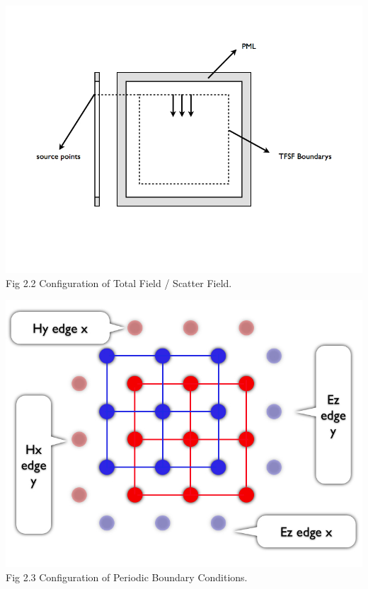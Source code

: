 \documentclass[openany]{book}
\begin{document}
\begin{center}
\includegraphics[scale=0.5]{images/tfsf.jpg}\\
Fig 2.2
Configuration of Total Field / Scatter Field.
\end{center}

\begin{center}
\includegraphics[scale=0.5]{images/pbc.jpg}\\
Fig 2.3
Configuration of Periodic Boundary Conditions.
\end{center}
\end{document}
